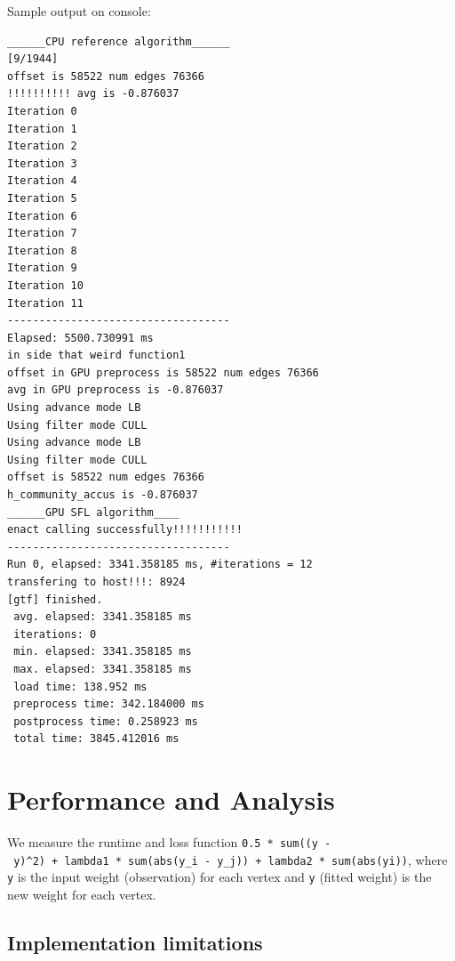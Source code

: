 \documentclass[10pt,oneside]{memoir}
\begin{document}
Sample output on console:

\begin{verbatim}
______CPU reference algorithm______                                                                                                                                  [9/1944]
offset is 58522 num edges 76366
!!!!!!!!!! avg is -0.876037
Iteration 0
Iteration 1
Iteration 2
Iteration 3
Iteration 4
Iteration 5
Iteration 6
Iteration 7
Iteration 8
Iteration 9
Iteration 10
Iteration 11
-----------------------------------
Elapsed: 5500.730991 ms
in side that weird function1
offset in GPU preprocess is 58522 num edges 76366
avg in GPU preprocess is -0.876037
Using advance mode LB
Using filter mode CULL
Using advance mode LB
Using filter mode CULL
offset is 58522 num edges 76366
h_community_accus is -0.876037
______GPU SFL algorithm____
enact calling successfully!!!!!!!!!!!
-----------------------------------
Run 0, elapsed: 3341.358185 ms, #iterations = 12
transfering to host!!!: 8924
[gtf] finished.
 avg. elapsed: 3341.358185 ms
 iterations: 0
 min. elapsed: 3341.358185 ms
 max. elapsed: 3341.358185 ms
 load time: 138.952 ms
 preprocess time: 342.184000 ms
 postprocess time: 0.258923 ms
 total time: 3845.412016 ms
\end{verbatim}

\hypertarget{performance-and-analysis-8}{%
\section{Performance and Analysis}\label{performance-and-analysis-8}}

We measure the runtime and loss function
\texttt{0.5\ *\ sum((y\textquotesingle{}\ -\ y)\^{}2)\ +\ lambda1\ *\ sum(abs(y\_i\textquotesingle{}\ -\ y\_j\textquotesingle{}))\ +\ lambda2\ *\ sum(abs(yi\textquotesingle{}))},
where \texttt{y} is the input weight (observation) for each vertex and
\texttt{y\textquotesingle{}} (fitted weight) is the new weight for each
vertex.

\hypertarget{implementation-limitations-8}{%
\subsection{Implementation
limitations}\label{implementation-limitations-8}}
\end{document}

